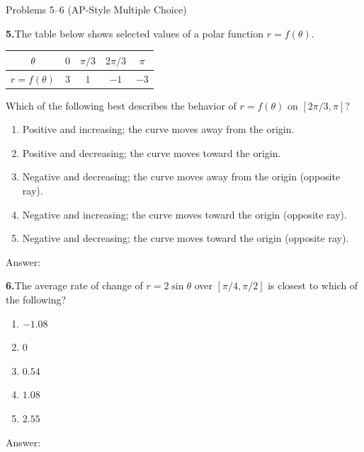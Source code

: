 \documentclass[10pt]{article}
\begin{document}
\vspace{0.08in}

\begin{notesbox}{Problems 5--6 (AP-Style Multiple Choice)}

\textbf{5.}\quad The table below shows selected values of a polar function $r = f(\theta)$.

\vspace{4pt}
\renewcommand{\arraystretch}{1.4}
\begin{tabular}{|c|c|c|c|c|}
\hline
$\theta$ & $0$ & $\pi/3$ & $2\pi/3$ & $\pi$ \\
\hline
$r = f(\theta)$ & $3$ & $1$ & $-1$ & $-3$ \\
\hline
\end{tabular}

\vspace{6pt}
Which of the following best describes the behavior of $r = f(\theta)$ on $[2\pi/3, \pi]$?

\begin{enumerate}[label=(\Alph*), leftmargin=2em, itemsep=3pt]
  \item Positive and increasing; the curve moves away from the origin.
  \item Positive and decreasing; the curve moves toward the origin.
  \item Negative and decreasing; the curve moves away from the origin (opposite ray).
  \item Negative and increasing; the curve moves toward the origin (opposite ray).
  \item Negative and decreasing; the curve moves toward the origin (opposite ray).
\end{enumerate}

Answer: \underline{\hspace{1.5cm}}

\vspace{0.12in}
\textbf{6.}\quad The average rate of change of $r = 2\sin\theta$ over $[\pi/4, \pi/2]$ is
closest to which of the following?

\begin{enumerate}[label=(\Alph*), leftmargin=2em, itemsep=3pt]
  \item $-1.08$
  \item $0$
  \item $0.54$
  \item $1.08$
  \item $2.55$
\end{enumerate}

Answer: \underline{\hspace{1.5cm}}

\end{notesbox}
\end{document}
